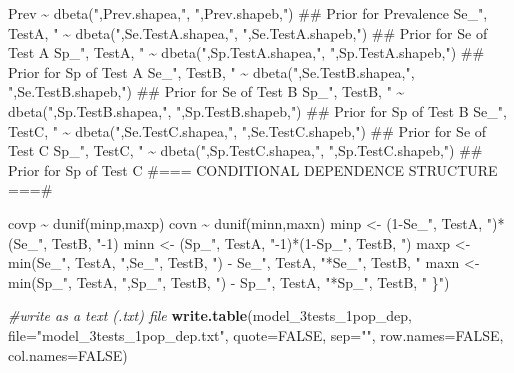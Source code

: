 \documentclass[
]{book}
\newenvironment{Shaded}{\begin{snugshade}}{\end{snugshade}}
\newcommand{\AttributeTok}[1]{\textcolor[rgb]{0.13,0.29,0.53}{#1}}
\newcommand{\CommentTok}[1]{\textcolor[rgb]{0.56,0.35,0.01}{\textit{#1}}}
\newcommand{\ConstantTok}[1]{\textcolor[rgb]{0.56,0.35,0.01}{#1}}
\newcommand{\FunctionTok}[1]{\textcolor[rgb]{0.13,0.29,0.53}{\textbf{#1}}}
\newcommand{\NormalTok}[1]{#1}
\newcommand{\StringTok}[1]{\textcolor[rgb]{0.31,0.60,0.02}{#1}}
\begin{document}
\begin{Shaded}
\begin{Highlighting}[]
\StringTok{  Prev \textasciitilde{} dbeta("}\NormalTok{,Prev.shapea,}\StringTok{", "}\NormalTok{,Prev.shapeb,}\StringTok{")    \#\# Prior for Prevalence}
\StringTok{  Se\_"}\NormalTok{, TestA, }\StringTok{" \textasciitilde{} dbeta("}\NormalTok{,Se.TestA.shapea,}\StringTok{", "}\NormalTok{,Se.TestA.shapeb,}\StringTok{")  \#\# Prior for Se of Test A}
\StringTok{  Sp\_"}\NormalTok{, TestA, }\StringTok{" \textasciitilde{} dbeta("}\NormalTok{,Sp.TestA.shapea,}\StringTok{", "}\NormalTok{,Sp.TestA.shapeb,}\StringTok{")  \#\# Prior for Sp of Test A}
\StringTok{  Se\_"}\NormalTok{, TestB, }\StringTok{" \textasciitilde{} dbeta("}\NormalTok{,Se.TestB.shapea,}\StringTok{", "}\NormalTok{,Se.TestB.shapeb,}\StringTok{")  \#\# Prior for Se of Test B}
\StringTok{  Sp\_"}\NormalTok{, TestB, }\StringTok{" \textasciitilde{} dbeta("}\NormalTok{,Sp.TestB.shapea,}\StringTok{", "}\NormalTok{,Sp.TestB.shapeb,}\StringTok{")  \#\# Prior for Sp of Test B}
\StringTok{  Se\_"}\NormalTok{, TestC, }\StringTok{" \textasciitilde{} dbeta("}\NormalTok{,Se.TestC.shapea,}\StringTok{", "}\NormalTok{,Se.TestC.shapeb,}\StringTok{")  \#\# Prior for Se of Test C}
\StringTok{  Sp\_"}\NormalTok{, TestC, }\StringTok{" \textasciitilde{} dbeta("}\NormalTok{,Sp.TestC.shapea,}\StringTok{", "}\NormalTok{,Sp.TestC.shapeb,}\StringTok{")  \#\# Prior for Sp of Test C}
\StringTok{  }
\StringTok{  \#=== CONDITIONAL DEPENDENCE STRUCTURE ===\#}

\StringTok{  covp \textasciitilde{} dunif(minp,maxp)}
\StringTok{  covn \textasciitilde{} dunif(minn,maxn)}
\StringTok{  minp \textless{}{-} (1{-}Se\_"}\NormalTok{, TestA, }\StringTok{")*(Se\_"}\NormalTok{, TestB, }\StringTok{"{-}1)}
\StringTok{  minn \textless{}{-} (Sp\_"}\NormalTok{, TestA, }\StringTok{"{-}1)*(1{-}Sp\_"}\NormalTok{, TestB, }\StringTok{")}
\StringTok{  maxp \textless{}{-} min(Se\_"}\NormalTok{, TestA, }\StringTok{",Se\_"}\NormalTok{, TestB, }\StringTok{") {-} Se\_"}\NormalTok{, TestA, }\StringTok{"*Se\_"}\NormalTok{, TestB, }\StringTok{"    }
\StringTok{  maxn \textless{}{-} min(Sp\_"}\NormalTok{, TestA, }\StringTok{",Sp\_"}\NormalTok{, TestB, }\StringTok{") {-} Sp\_"}\NormalTok{, TestA, }\StringTok{"*Sp\_"}\NormalTok{, TestB, }\StringTok{"  }
\StringTok{  }
\StringTok{\}"}\NormalTok{)}

\CommentTok{\#write as a text (.txt) file}
\FunctionTok{write.table}\NormalTok{(model\_3tests\_1pop\_dep, }
            \AttributeTok{file=}\StringTok{"model\_3tests\_1pop\_dep.txt"}\NormalTok{, }
            \AttributeTok{quote=}\ConstantTok{FALSE}\NormalTok{, }
            \AttributeTok{sep=}\StringTok{""}\NormalTok{, }
            \AttributeTok{row.names=}\ConstantTok{FALSE}\NormalTok{,}
            \AttributeTok{col.names=}\ConstantTok{FALSE}\NormalTok{)}
\end{Highlighting}
\end{Shaded}
\end{document}

